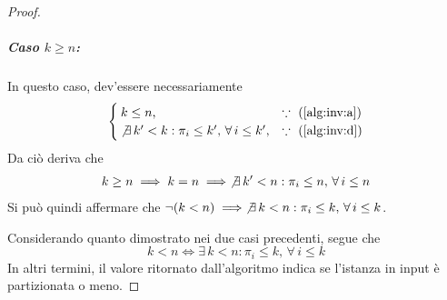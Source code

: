 \documentclass{article}
\begin{document}
\begin{proof}
    \subparagraph{Caso $k \geq n$:}
    In questo caso, dev'essere necessariamente
    \begin{equation*}
        \begin{cases}
            k \leq n \mbox{,}                                             & \because \mbox{ (\ref{alg:inv:a})} \\
            \not\exists\, k' < k : \pi_i \leq k',\, \forall\, i \leq k' \mbox{,} & \because \mbox{ (\ref{alg:inv:d})}
        \end{cases}
    \end{equation*}
    Da ciò deriva che
    \begin{align*}
        k \geq n \implies k = n  \implies \not\exists\, k' < n : \pi_i \leq n,\, \forall\, i \leq n
    \end{align*}
    Si può quindi affermare che $\neg(k < n) \implies \not\exists\, k < n : \pi_i \leq k,\, \forall\, i \leq k$.

    Considerando quanto dimostrato nei due casi precedenti, segue che
    \[ k < n \iff \exists\, k < n : \pi_i \leq k,\, \forall\, i \leq k \]
    In altri termini, il valore ritornato dall'algoritmo indica se l'istanza in input è partizionata o meno.

\end{proof}
\end{document}
